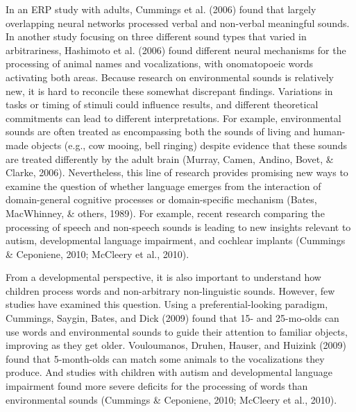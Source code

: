 \documentclass[english,floatsintext,man]{apa6}
\theoremstyle{definition}
\theoremstyle{definition}
\theoremstyle{definition}
\theoremstyle{remark}
\begin{document}
In an ERP study with adults, Cummings et al. (2006) found that largely
overlapping neural networks processed verbal and non-verbal meaningful
sounds. In another study focusing on three different sound types that
varied in arbitrariness, Hashimoto et al. (2006) found different neural
mechanisms for the processing of animal names and vocalizations, with
onomatopoeic words activating both areas. Because research on
environmental sounds is relatively new, it is hard to reconcile these
somewhat discrepant findings. Variations in tasks or timing of stimuli
could influence results, and different theoretical commitments can lead
to different interpretations. For example, environmental sounds are
often treated as encompassing both the sounds of living and human-made
objects (e.g., cow mooing, bell ringing) despite evidence that these
sounds are treated differently by the adult brain (Murray, Camen,
Andino, Bovet, \& Clarke, 2006). Nevertheless, this line of research
provides promising new ways to examine the question of whether language
emerges from the interaction of domain-general cognitive processes or
domain-specific mechanism (Bates, MacWhinney, \& others, 1989). For
example, recent research comparing the processing of speech and
non-speech sounds is leading to new insights relevant to autism,
developmental language impairment, and cochlear implants (Cummings \&
Ceponiene, 2010; McCleery et al., 2010).

From a developmental perspective, it is also important to understand how
children process words and non-arbitrary non-linguistic sounds. However,
few studies have examined this question. Using a preferential-looking
paradigm, Cummings, Saygin, Bates, and Dick (2009) found that 15- and
25-mo-olds can use words and environmental sounds to guide their
attention to familiar objects, improving as they get older. Vouloumanos,
Druhen, Hauser, and Huizink (2009) found that 5-month-olds can match
some animals to the vocalizations they produce. And studies with
children with autism and developmental language impairment found more
severe deficits for the processing of words than environmental sounds
(Cummings \& Ceponiene, 2010; McCleery et al., 2010).
\end{document}
